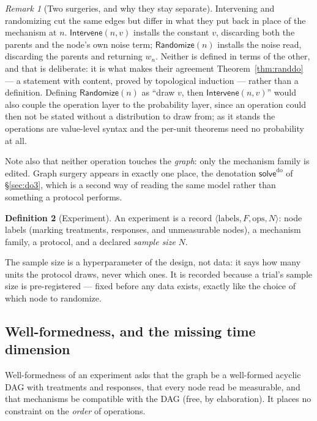 \documentclass[11pt,a4paper]{article}
\theoremstyle{definition}
\newtheorem{definition}{Definition}[section]
\theoremstyle{plain}
\theoremstyle{remark}
\newtheorem{remark}[definition]{Remark}
\newcommand{\solve}{\mathsf{solve}}
\newcommand{\solvedo}{\solve^{\mathrm{do}}}
\begin{document}
\begin{remark}[Two surgeries, and why they stay separate]
\label{rem:twosurgeries}
Intervening and randomizing cut the same edges but differ in what they put
back in place of the mechanism at $n$. $\mathsf{Intervene}(n,v)$ installs
the constant $v$, discarding both the parents and the node's own noise
term; $\mathsf{Randomize}(n)$ installs the noise read, discarding the
parents and returning $w_n$. Neither is defined in terms of the other, and
that is deliberate: it is what makes their agreement
Theorem~\ref{thm:randdo} --- a statement with content, proved by
topological induction --- rather than a definition. Defining
$\mathsf{Randomize}(n)$ as ``draw $v$, then $\mathsf{Intervene}(n,v)$''
would also couple the operation layer to the probability layer, since an
operation could then not be stated without a distribution to draw from; as
it stands the operations are value-level syntax and the per-unit theorems
need no probability at all.

Note also that neither operation touches the \emph{graph}: only the
mechanism family is edited. Graph surgery appears in exactly one place,
the denotation $\solvedo$ of \S\ref{sec:do3}, which is a second way of
reading the same model rather than something a protocol performs.
\end{remark}

\begin{definition}[Experiment]
An experiment is a record $\langle \text{labels}, F, \text{ops}, N \rangle$:
node labels (marking treatments, responses, and unmeasurable nodes), a
mechanism family, a protocol, and a declared \emph{sample size} $N$.
\end{definition}

The sample size is a hyperparameter of the design, not data: it says how
many units the protocol draws, never which ones. It is recorded because a
trial's sample size is pre-registered --- fixed before any data exists,
exactly like the choice of which node to randomize.

\subsection{Well-formedness, and the missing time dimension}

Well-formedness of an experiment asks that the graph be a well-formed
acyclic DAG with treatments and responses, that every node read be
measurable, and that mechanisms be compatible with the DAG (free, by
elaboration). It places no constraint on the \emph{order} of operations.
\end{document}
